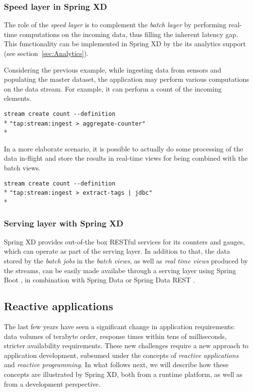 \subsubsection {Speed layer in Spring XD}

The role of the \emph{speed layer} is to complement the \emph{batch layer} 
by performing real-time computations on the incoming data, thus filling the 
inherent latency gap. This functionality can be implemented in Spring XD by 
the its analytics support (see section~\ref{sec:Analytics}).

Considering the previous example, while ingesting data from sensors and 
populating the master dataset, the application may perform various computations 
on the data stream. For example, it can perform a count of the incoming elements. 

\verb;stream create count --definition  ;\\*
\verb;"tap:stream:ingest > aggregate-counter";\\*

In a more elaborate scenario, it is possible to actually do 
some processing of the data in-flight and store the results in real-time views
for being combined with the batch views.

\verb;stream create count --definition  ;\\*
\verb;"tap:stream:ingest > extract-tags | jdbc";\\*

\subsubsection {Serving layer with Spring XD}

Spring XD provides out-of-the box RESTful services for its counters and gauges,
which can operate as part of the serving layer. In addition to that,  
the data stored by the \emph{batch jobs} in the 
\emph{batch views}, as well as \emph{real time views} produced by the streams, 
can be easily made availabe through a serving layer using Spring Boot \cite{spring-boot}, 
in combination with Spring Data \cite{spring-data} or Spring Data REST \cite{spring-data-rest}.

\subsection {Reactive applications}

The last few years have seen a significant change in application requirements:
data volumes of terabyte order, response times within tens of milliseconds, stricter
availability requirements. These new challenges require a new approach to application
development, subsumed under the concepts of \emph{reactive applications} and \emph{reactive
programming}. In what follows next, we will describe how these concepts are
illustrated by Spring XD, both from a runtime platform, as well as from a development perspective.

